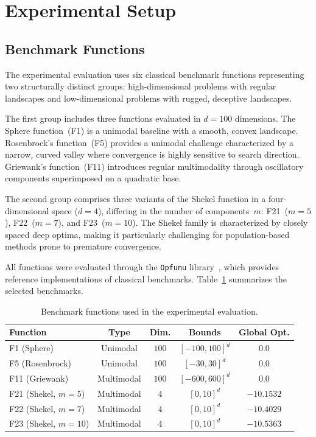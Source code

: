 \documentclass[conference]{IEEEtran}
\begin{document}
\section{Experimental Setup}
\label{sec:experimental_setup}

\subsection{Benchmark Functions}
\label{subsec:benchmarks}

The experimental evaluation uses six classical benchmark functions representing two structurally distinct groups: high-dimensional problems with regular landscapes and low-dimensional problems with rugged, deceptive landscapes.

The first group includes three functions evaluated in $d = 100$ dimensions. The Sphere function~(F1) is a unimodal baseline with a smooth, convex landscape. Rosenbrock's function~(F5) provides a unimodal challenge characterized by a narrow, curved valley where convergence is highly sensitive to search direction. Griewank's function~(F11) introduces regular multimodality through oscillatory components superimposed on a quadratic base.

The second group comprises three variants of the Shekel function in a four-dimensional space ($d = 4$), differing in the number of components~$m$: F21~($m{=}5$), F22~($m{=}7$), and F23~($m{=}10$). The Shekel family is characterized by closely spaced deep optima, making it particularly challenging for population-based methods prone to premature convergence.

All functions were evaluated through the \texttt{Opfunu} library~\cite{Van_Thieu_2024_Opfunu}, which provides reference implementations of classical benchmarks. Table~\ref{tab:benchmark_functions} summarizes the selected benchmarks.

\begin{table}[!ht]
    \caption{Benchmark functions used in the experimental evaluation.}
    \label{tab:benchmark_functions}
    \centering
    \begin{tabular}{lcccc}
    \toprule
    Function & Type & Dim. & Bounds & Global Opt. \\
    \midrule
    F1 (Sphere)            & Unimodal   & $100$ & $[-100, 100]^d$ & $0.0$ \\
    F5 (Rosenbrock)        & Unimodal   & $100$ & $[-30, 30]^d$   & $0.0$ \\
    F11 (Griewank)         & Multimodal & $100$ & $[-600, 600]^d$ & $0.0$ \\
    F21 (Shekel, $m{=}5$)  & Multimodal & $4$   & $[0, 10]^d$     & $-10.1532$ \\
    F22 (Shekel, $m{=}7$)  & Multimodal & $4$   & $[0, 10]^d$     & $-10.4029$ \\
    F23 (Shekel, $m{=}10$) & Multimodal & $4$   & $[0, 10]^d$     & $-10.5363$ \\
    \bottomrule
    \end{tabular}
\end{table}
\end{document}
